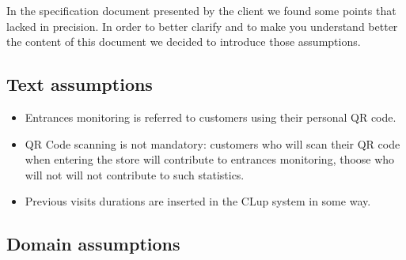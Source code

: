 In the specification document presented by the client we found some points that lacked in precision. In order to better clarify and to make you understand better the content of this document we decided to introduce those assumptions.
\subsection{Text assumptions}
\begin{itemize}
    \item Entrances monitoring is referred to customers using their personal QR code.
    \item QR Code scanning is not mandatory: customers who will scan their QR code when entering the store will contribute to entrances monitoring, thoose who will not will not contribute to such statistics.
    \item Previous visits durations are inserted in the CLup system in some way.
\end{itemize}

\subsection{Domain assumptions}

